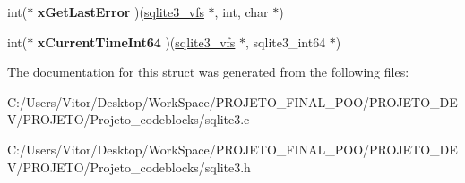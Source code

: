 \begin{DoxyCompactItemize}
\item 
\hypertarget{structsqlite3__vfs_a4994110c79d082f7770ce553d507748f}{int($\ast$ {\bfseries x\-Get\-Last\-Error} )(\hyperlink{structsqlite3__vfs}{sqlite3\-\_\-vfs} $\ast$, int, char $\ast$)}\label{structsqlite3__vfs_a4994110c79d082f7770ce553d507748f}

\item 
\hypertarget{structsqlite3__vfs_aa281584c422969b7f0df0e5f918fc590}{int($\ast$ {\bfseries x\-Current\-Time\-Int64} )(\hyperlink{structsqlite3__vfs}{sqlite3\-\_\-vfs} $\ast$, sqlite3\-\_\-int64 $\ast$)}\label{structsqlite3__vfs_aa281584c422969b7f0df0e5f918fc590}

\end{DoxyCompactItemize}


The documentation for this struct was generated from the following files\-:\begin{DoxyCompactItemize}
\item 
C\-:/\-Users/\-Vitor/\-Desktop/\-Work\-Space/\-P\-R\-O\-J\-E\-T\-O\-\_\-\-F\-I\-N\-A\-L\-\_\-\-P\-O\-O/\-P\-R\-O\-J\-E\-T\-O\-\_\-\-D\-E\-V/\-P\-R\-O\-J\-E\-T\-O/\-Projeto\-\_\-codeblocks/sqlite3.\-c\item 
C\-:/\-Users/\-Vitor/\-Desktop/\-Work\-Space/\-P\-R\-O\-J\-E\-T\-O\-\_\-\-F\-I\-N\-A\-L\-\_\-\-P\-O\-O/\-P\-R\-O\-J\-E\-T\-O\-\_\-\-D\-E\-V/\-P\-R\-O\-J\-E\-T\-O/\-Projeto\-\_\-codeblocks/sqlite3.\-h\end{DoxyCompactItemize}

